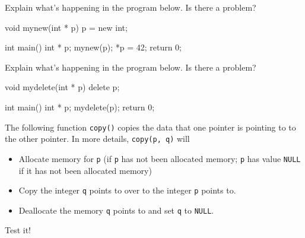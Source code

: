 \begin{ex}
Explain what's happening in the program below. Is there a problem?

\begin{consolethree}[escapeinside=||]
void mynew(int * p)
{
    p = new int;
}

int main()
{
    int * p;
    mynew(p);
    *p = 42;
    return 0;
}
\end{consolethree}
\end{ex}

\begin{ex}
Explain what's happening in the program below. Is there a problem?

\begin{consolethree}[escapeinside=||]          
void mydelete(int * p)
{
    delete p;
}

int main()
{
    int * p;
    mydelete(p);
    return 0;
}
\end{consolethree}
\end{ex}

\begin{ex}
The following function \texttt{copy()} copies the data that one pointer is pointing to to the other pointer. In more details, \texttt{copy(p, q)} will

\begin{itemize}
\item
  Allocate memory for \texttt{p} (if \texttt{p} has not been allocated
  memory; \texttt{p} has value \texttt{NULL} if it has not been allocated
  memory)
\item
  Copy the integer \texttt{q} points to over to the integer \texttt{p}
  points to.
\item
  Deallocate the memory \texttt{q} points to and set \texttt{q} to
  \texttt{NULL}.
\end{itemize}
  Test it!

\end{ex}
